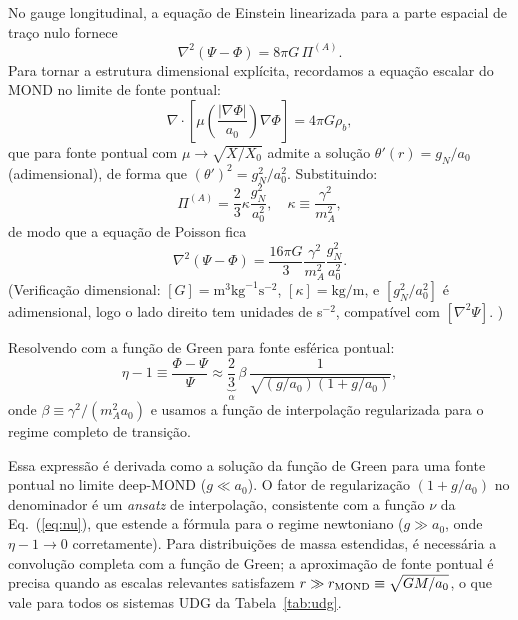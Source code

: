 \documentclass[aps,prd,twocolumn,showpacs,superscriptaddress]{revtex4-2}
\newcommand{\aO}{a_0}
\begin{document}
No gauge longitudinal, a equação de Einstein linearizada para a
parte espacial de traço nulo fornece
\begin{equation}
  \nabla^2(\Psi-\Phi) = 8\pi G\,\Pi^{(A)}.
\end{equation}
Para tornar a estrutura dimensional explícita, recordamos a
equação escalar do MOND no limite de fonte pontual:
\begin{equation}
  \nabla\cdot\!\left[\mu\!\left(\frac{|\nabla\Phi|}{\aO}\right)\nabla\Phi\right]
  = 4\pi G\rho_b,
\end{equation}
que para fonte pontual com $\mu \to \sqrt{X/X_0}$ admite a solução
$\theta'(r) = g_N/a_0$ (adimensional), de forma que
$(\theta')^2 = g_N^2/a_0^2$. Substituindo:
\begin{equation}
  \Pi^{(A)} = \frac{2}{3}\kappa\frac{g_N^2}{a_0^2}, \quad
  \kappa \equiv \frac{\gamma^2}{m_A^2},
\end{equation}
de modo que a equação de Poisson fica
\begin{equation}
  \nabla^2(\Psi-\Phi) = \frac{16\pi G}{3}\frac{\gamma^2}{m_A^2}
  \frac{g_N^2}{a_0^2}.
\end{equation}
(Verificação dimensional: $[G] = \text{m}^3\text{kg}^{-1}\text{s}^{-2}$,
$[\kappa] = \text{kg/m}$, e $[g_N^2/a_0^2]$ é adimensional, logo
o lado direito tem unidades de s$^{-2}$, compatível com $[\nabla^2\Psi]$. \checkmark)

Resolvendo com a função de Green para fonte esférica pontual:
\begin{equation}
  \eta - 1 \equiv \frac{\Phi-\Psi}{\Psi}
  \approx \underbrace{\frac{2}{3}}_{\alpha}\,\beta\,
  \frac{1}{\sqrt{(g/\aO)(1+g/\aO)}},
  \label{eq:eta}
\end{equation}
onde $\beta \equiv \gamma^2/(m_A^2\aO)$ e usamos a função de
interpolação regularizada para o regime completo de transição.

Essa expressão é derivada como a solução da função de Green para
uma fonte pontual no limite deep-MOND ($g \ll \aO$).
O fator de regularização $(1 + g/\aO)$ no denominador é um
\textit{ansatz} de interpolação, consistente com a função $\nu$
da Eq.~(\ref{eq:nu}), que estende a fórmula para o regime
newtoniano ($g \gg \aO$, onde $\eta - 1 \to 0$ corretamente).
Para distribuições de massa estendidas, é necessária a convolução
completa com a função de Green; a aproximação de fonte pontual é
precisa quando as escalas relevantes satisfazem
$r \gg r_{\rm MOND} \equiv \sqrt{GM/\aO}$, o que vale para
todos os sistemas UDG da Tabela~\ref{tab:udg}.
\end{document}
